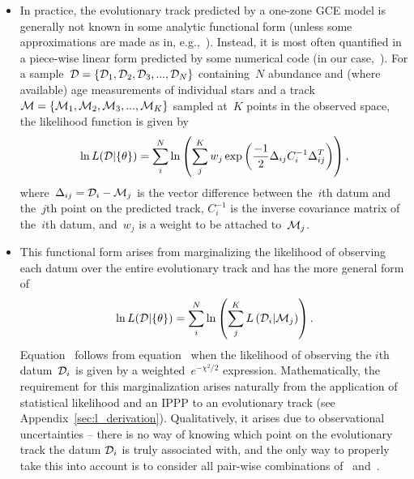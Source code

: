 \documentclass[ms.tex]{subfiles}
\begin{document}
\begin{itemize}
	\item In practice, the evolutionary track predicted by a one-zone GCE model
	is generally not known in some analytic functional form (unless some
	approximations are made as in, e.g.,~\citealp{Weinberg2017}).
	Instead, it is most often quantified in a piece-wise linear form predicted
	by some numerical code (in our case,~\vice).
	For a sample~$\mathcal{D} = \{\mathcal{D}_1, \mathcal{D}_2, \mathcal{D}_3,
	..., \mathcal{D}_N\}$ containing~$N$ abundance and (where available) age
	measurements of individual stars and a track~$\mathcal{M} = \{\mathcal{M}_1,
	\mathcal{M}_2, \mathcal{M}_3, ..., \mathcal{M}_K\}$ sampled at~$K$ points in
	the observed space, the likelihood function is given by
	\begin{equation}
	\ln L(\mathcal{D} | \{\theta\}) = \sum_i^N \ln \left(
	\sum_j^K w_j \exp \left(
	\frac{-1}{2} \Delta_{ij} C_i^{-1} \Delta_{ij}^T
	\right)
	\right),
	\label{eq:likelihood}
	\end{equation}
	where~$\Delta_{ij} = \mathcal{D}_i - \mathcal{M}_j$ is the vector difference
	between the~$i$th datum and the~$j$th point on the predicted track,
	$C_i^{-1}$ is the inverse covariance matrix of the~$i$th datum, and~$w_j$
	is a weight to be attached to~$\mathcal{M}_j$.

	\item This functional form arises from marginalizing the likelihood of
	observing each datum over the entire evolutionary track and has the more
	general form of
	\begin{equation}
	\ln L(\mathcal{D} | \{\theta\}) = \sum_i^N \ln \left(
	\sum_j^K L\left(\mathcal{D}_i | \mathcal{M}_j
	\right)\right).
	\label{eq:likelihood_general}
	\end{equation}
	Equation~ follows from
	equation~ when the likelihood of observing the
	$i$th datum~$\mathcal{D}_i$ is given by a weighted~$e^{-\chi^2/2}$
	expression.
	Mathematically, the requirement for this marginalization arises naturally
	from the application of statistical likelihood and an IPPP to an
	evolutionary track (see Appendix~\ref{sec:l_derivation}).
	Qualitatively, it arises due to observational uncertainties -- there is no
	way of knowing which point on the evolutionary track the datum
	$\mathcal{D}_i$ is truly associated with, and the only way to properly take
	this into account is to consider all pair-wise combinations of~
	and~.


\end{itemize}
\end{document}

